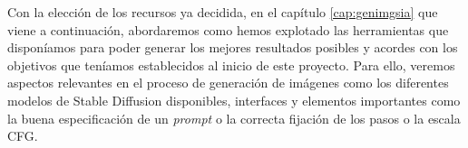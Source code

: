 Con la elección de los recursos ya decidida, en el capítulo \ref{cap:genimgsia} que viene a continuación, abordaremos como hemos explotado las herramientas que disponíamos para poder generar los mejores resultados posibles y acordes con los objetivos que teníamos establecidos al inicio de este proyecto. Para ello, veremos aspectos relevantes en el proceso de generación de imágenes como los diferentes modelos de Stable Diffusion disponibles, interfaces y elementos importantes como la buena especificación de un \textit{prompt} o la correcta fijación de los pasos o la escala CFG.\\